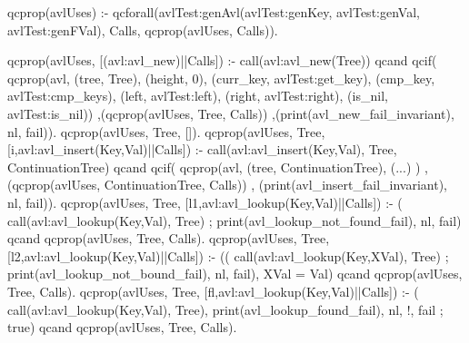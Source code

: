 \begin{yapcode}
 qcprop(avlUses) :-
   qcforall(avlTest:genAvl(avlTest:genKey,
              avlTest:genVal, avlTest:genFVal),
            Calls, qcprop({avlUses, Calls})).

 qcprop({avlUses, [(avl:avl_new)||Calls]}) :-
   call(avl:avl_new(Tree))
  qcand
   qcif(
     qcprop({avl, (tree, Tree), (height, 0),
                  (curr_key, avlTest:get_key),
                  (cmp_key, avlTest:cmp_keys),
                  (left, avlTest:left),
                  (right, avlTest:right),
                  (is_nil, avlTest:is_nil)})
   ,(qcprop({avlUses, Tree, Calls}))
   ,(print(avl_new_fail_invariant), nl, fail)).
 qcprop({avlUses, Tree, []}).
 qcprop({avlUses, Tree,
      [{i,avl:avl_insert(Key,Val)}||Calls]}) :-
   call(avl:avl_insert(Key,Val),
        Tree, ContinuationTree)
     qcand
   qcif(
     qcprop({avl, (tree, ContinuationTree),
             (...) })
   , (qcprop({avlUses, ContinuationTree,
              Calls}))
   , (print(avl_insert_fail_invariant),
      nl, fail)).
 qcprop({avlUses, Tree,
      [{l1,avl:avl_lookup(Key,Val)}||Calls]}) :-
   ( call(avl:avl_lookup(Key,Val), Tree)
   ; print(avl_lookup_not_found_fail),
     nl, fail)
     qcand
   qcprop({avlUses, Tree, Calls}).
 qcprop({avlUses, Tree,
      [{l2,avl:avl_lookup(Key,Val)}||Calls]}) :-
   (( call(avl:avl_lookup(Key,XVal), Tree)
    ; print(avl_lookup_not_bound_fail),
     nl, fail),
    XVal = Val)
     qcand
   qcprop({avlUses, Tree, Calls}).
 qcprop({avlUses, Tree,
      [{fl,avl:avl_lookup(Key,Val)}||Calls]}) :-
   ( call(avl:avl_lookup(Key,Val), Tree),
     print(avl_lookup_found_fail), nl, !, fail
   ; true)
     qcand
   qcprop({avlUses, Tree, Calls}).
\end{yapcode}


